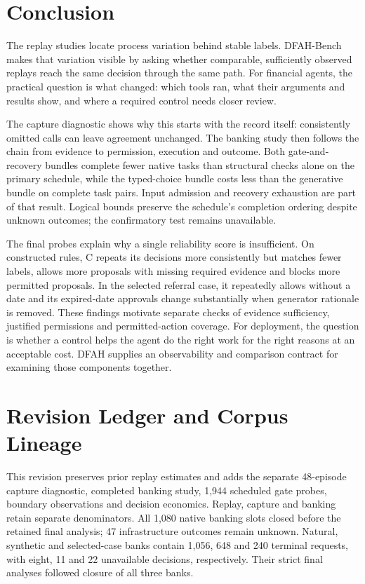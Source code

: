 \documentclass{article}
\begin{document}
\section{Conclusion}

The replay studies locate process variation behind stable labels. DFAH-Bench
makes that variation visible by asking whether comparable, sufficiently
observed replays reach the same decision through the same path. For financial
agents, the practical question is what changed: which tools ran, what their
arguments and results show, and where a required control needs closer review.

The capture diagnostic shows why this starts with the record itself:
consistently omitted calls can leave agreement unchanged. The banking study
then follows the chain from evidence to permission, execution and outcome.
Both gate-and-recovery bundles complete fewer native tasks than structural
checks alone on the primary schedule, while the typed-choice bundle costs less
than the generative bundle on complete task pairs. Input admission and recovery
exhaustion are part of that result. Logical bounds preserve the schedule's
completion ordering despite unknown outcomes; the confirmatory test remains
unavailable.

The final probes explain why a single reliability score is insufficient.
On constructed rules, C repeats its decisions more consistently but matches
fewer labels, allows more proposals with missing required evidence and blocks
more permitted proposals.
In the selected referral case, it repeatedly allows without a date and its
expired-date approvals change substantially when generator rationale is removed.
These findings motivate separate checks of evidence sufficiency, justified
permissions and permitted-action coverage. For deployment, the question is
whether a control helps the agent do the right work for the right reasons at
an acceptable cost. DFAH supplies an observability and comparison contract
for examining those components together.




\appendix

\section{Revision Ledger and Corpus Lineage}
\label{app:revision}

This revision preserves prior replay estimates and adds the separate 48-episode
capture diagnostic, completed banking study, 1,944 scheduled gate probes, boundary
observations and decision economics. Replay, capture and banking retain
separate denominators. All 1,080 native banking slots closed before the retained
final analysis; 47 infrastructure outcomes remain unknown. Natural, synthetic
and selected-case banks contain 1,056, 648 and 240 terminal requests, with
eight, 11 and 22 unavailable decisions, respectively. Their strict final
analyses followed closure of all three banks.
\end{document}
